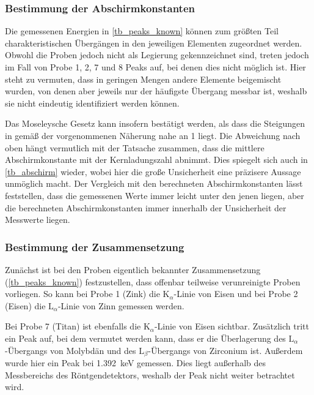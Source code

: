 \documentclass[
	a4paper,
	12pt,
	pagesize,
	ngerman
]{scrartcl}
\begin{document}
	\subsubsection{Bestimmung der Abschirmkonstanten}
	Die gemessenen Energien in \cref{tb_peaks_known} können zum größten Teil charakteristischen Übergängen in den jeweiligen Elementen zugeordnet werden.
	Obwohl die Proben jedoch nicht als Legierung gekennzeichnet sind, treten jedoch im Fall von Probe 1, 2, 7 und 8 Peaks auf, bei denen dies nicht möglich ist.
	Hier steht zu vermuten, dass in geringen Mengen andere Elemente beigemischt wurden, von denen aber jeweils nur der häufigste Übergang messbar ist, weshalb sie nicht eindeutig identifiziert werden können.

	Das Moseleysche Gesetz kann insofern bestätigt werden, als dass die Steigungen in  gemäß der vorgenommenen Näherung nahe an \num{1} liegt.
	Die Abweichung nach oben hängt vermutlich mit der Tatsache zusammen, dass die mittlere Abschirmkonstante mit der Kernladungszahl abnimmt.
	Dies spiegelt sich auch in \cref{tb_abschirm} wieder, wobei hier die große Unsicherheit eine präzisere Aussage unmöglich macht.
	Der Vergleich mit den berechneten Abschirmkonstanten lässt feststellen, dass die gemessenen Werte immer leicht unter den jenen liegen, aber die berechneten Abschirmkonstanten immer innerhalb der Unsicherheit der Messwerte liegen.

	\subsubsection{Bestimmung der Zusammensetzung}
	Zunächst ist bei den Proben eigentlich bekannter Zusammensetzung (\cref{tb_peaks_known}) festzustellen, dass offenbar teilweise verunreinigte Proben vorliegen.
	So kann bei Probe 1 (Zink) die $\text{K}_\alpha$-Linie von Eisen und bei Probe 2 (Eisen) die $\text{L}_\alpha$-Linie von Zinn gemessen werden.

	Bei Probe 7 (Titan) ist ebenfalls die  $\text{K}_\alpha$-Linie von Eisen sichtbar.
	Zusätzlich tritt ein Peak auf, bei dem vermutet werden kann, dass er die Überlagerung des $\text{L}_\alpha$-Übergangs von Molybdän und des $\text{L}_\beta$-Übergangs von Zirconium ist.
	Außerdem wurde hier ein Peak bei \SI{1,392}{keV} gemessen.
	Dies liegt außerhalb des Messbereichs des Röntgendetektors, weshalb der Peak nicht weiter betrachtet wird.
\end{document}
